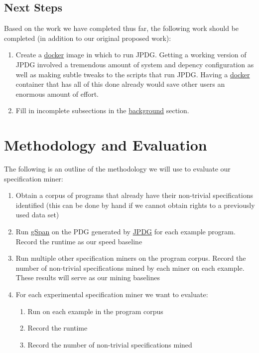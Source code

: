 \documentclass[12pt]{article}
\begin{document}
\subsection{Next Steps}
Based on the work we have completed thus far, the following work should be completed (in addition to our original proposed work):

\begin{enumerate}
    \item Create a \hyperref[subsection:Docker]{docker} image in which to run JPDG. Getting a working version of JPDG involved a tremendous amount of system and depency configuration as well as making subtle tweaks to the scripts that run JPDG. Having a \hyperref[subsection:Docker]{docker} container that has all of this done already would save other users an enormous amount of effort.
    \item Fill in incomplete subsections in the \hyperref[section:Background]{background} section.
\end{enumerate}

\section{Methodology and Evaluation}
The following is an outline of the methodology we will use to evaluate our specification miner:

\begin{enumerate}
    \item Obtain a corpus of programs that already have their non-trivial specifications identified (this can be done by hand if we cannot obtain rights to a previously used data set)
    \item Run \hyperref[subsection:gSpan]{gSpan} on the PDG generated by \hyperref[subsection:JPDG]{JPDG} for each example program. Record the runtime as our speed baseline
    \item Run multiple other specification miners on the program corpus. Record the number of non-trivial specifications mined by each miner on each example. These results will serve as our mining baselines
    \item For each experimental specification miner we want to evaluate:
    \begin{enumerate}
        \item Run on each example in the program corpus
        \item Record the runtime
        \item Record the number of non-trivial specifications mined
    \end{enumerate}
\end{enumerate}
\end{document}
